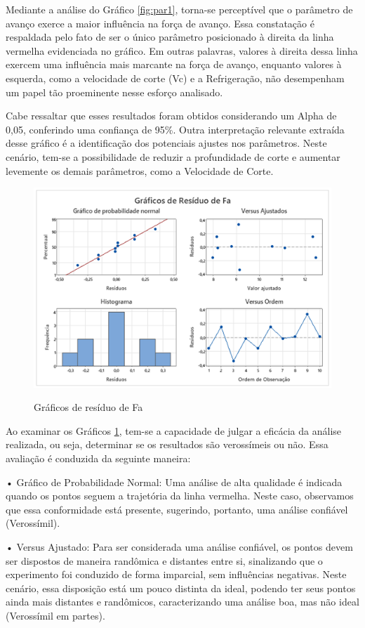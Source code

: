 \documentclass[deposito, acronym, symbols]{fei}
\begin{document}
Mediante a análise do Gráfico \ref{fig:par1}, torna-se perceptível que o parâmetro de avanço exerce a maior influência na força de avanço. Essa constatação é respaldada pelo fato de ser o único parâmetro posicionado à direita da linha vermelha evidenciada no gráfico. Em outras palavras, valores à direita dessa linha exercem uma influência mais marcante na força de avanço, enquanto valores à esquerda, como a velocidade de corte (Vc) e a Refrigeração, não desempenham um papel tão proeminente nesse esforço analisado.

Cabe ressaltar que esses resultados foram obtidos considerando um Alpha de 0,05, conferindo uma confiança de 95\%. Outra interpretação relevante extraída desse gráfico é a identificação dos potenciais ajustes nos parâmetros. Neste cenário, tem-se a possibilidade de reduzir a profundidade de corte e aumentar levemente os demais parâmetros, como a Velocidade de Corte.

\begin{figure}[!htp]
    \centering
    \caption{Gráficos de resíduo de Fa}
    \includegraphics[width=0.8\linewidth]{Imagens/residuo 1.png}
    \label{fig:res1}
\end{figure}

Ao examinar os Gráficos \ref{fig:res1}, tem-se a capacidade de julgar a eficácia da análise realizada, ou seja, determinar se os resultados são verossímeis ou não. Essa avaliação é conduzida da seguinte maneira:

•	Gráfico de Probabilidade Normal: Uma análise de alta qualidade é indicada quando os pontos seguem a trajetória da linha vermelha. Neste caso, observamos que essa conformidade está presente, sugerindo, portanto, uma análise confiável (Verossímil).

•	Versus Ajustado: Para ser considerada uma análise confiável, os pontos devem ser dispostos de maneira randômica e distantes entre si, sinalizando que o experimento foi conduzido de forma imparcial, sem influências negativas. Neste cenário, essa disposição está um pouco distinta da ideal, podendo ter seus pontos ainda mais distantes e randômicos, caracterizando uma análise boa, mas não ideal (Verossímil em partes).
\end{document}
